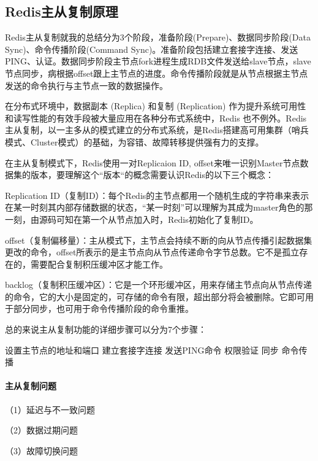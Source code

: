 \documentclass[../../../interview-questions.tex]{subfiles}
\begin{document}
\subsection{Redis主从复制原理}

Redis主从复制就我的总结分为3个阶段，准备阶段(Prepare)、数据同步阶段(Data Sync)、命令传播阶段(Command Sync)。准备阶段包括建立套接字连接、发送PING、认证。数据同步阶段主节点fork进程生成RDB文件发送给slave节点，slave节点同步，病根据offset跟上主节点的进度。命令传播阶段就是从节点根据主节点发送的命令执行与主节点一致的数据操作。

在分布式环境中，数据副本 (Replica) 和复制 (Replication) 作为提升系统可用性和读写性能的有效手段被大量应用在各种分布式系统中，Redis 也不例外。Redis主从复制，以一主多从的模式建立的分布式系统，是Redis搭建高可用集群（哨兵模式、Cluster模式）的基础，为容错、故障转移提供强有力的支撑。

在主从复制模式下，Redis使用一对Replicaion ID, offset来唯一识别Master节点数据集的版本，要理解这个“版本“的概念需要认识Redis的以下三个概念：

Replication ID（复制ID）：每个Redis的主节点都用一个随机生成的字符串来表示在某一时刻其内部存储数据的状态，“某一时刻”可以理解为其成为master角色的那一刻，由源码可知在第一个从节点加入时，Redis初始化了复制ID。

offset（复制偏移量）：主从模式下，主节点会持续不断的向从节点传播引起数据集更改的命令，offset所表示的是主节点向从节点传递命令字节总数。它不是孤立存在的，需要配合复制积压缓冲区才能工作。

backlog（复制积压缓冲区）：它是一个环形缓冲区，用来存储主节点向从节点传递的命令，它的大小是固定的，可存储的命令有限，超出部分将会被删除。它即可用于部分同步，也可用于命令传播阶段的命令重推。



总的来说主从复制功能的详细步骤可以分为7个步骤：

设置主节点的地址和端口
建立套接字连接
发送PING命令
权限验证
同步
命令传播

\paragraph{主从复制问题}

（1）延迟与不一致问题

（2）数据过期问题

（3）故障切换问题
\end{document}
